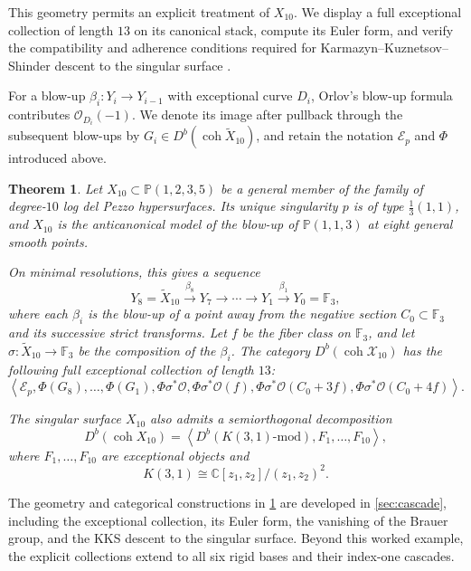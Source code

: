 \documentclass[11pt]{article}
\theoremstyle{plain}
\newtheorem{theorem}{Theorem}[section]
\theoremstyle{definition}
\theoremstyle{remark}
\newcommand{\Pp}{\mathbb P}
\newcommand{\F}{\mathbb F}
\newcommand{\C}{\mathbb C}
\newcommand{\Db}{D^b}
\newcommand{\coh}{\operatorname{coh}}
\newcommand{\OO}{\mathcal O}
\begin{document}
This geometry permits an explicit treatment of \(X_{10}\). We display a full exceptional collection of length \(13\) on its canonical stack, compute its Euler form, and verify the compatibility and adherence conditions required for Karmazyn--Kuznetsov--Shinder descent to the singular surface \cite{KKS2020}.

For a blow-up \(\beta_i:Y_i\to Y_{i-1}\) with exceptional curve \(D_i\), Orlov's blow-up formula contributes \(\OO_{D_i}(-1)\). We denote its image after pullback through the subsequent blow-ups by \(G_i\in\Db(\coh\widetilde X_{10})\), and retain the notation \(\mathcal E_p\) and \(\Phi\) introduced above.

\begin{theorem}\label{thm:X10-main}
Let \(X_{10}\subset \Pp(1,2,3,5)\) be a general member of the family of degree-\(10\) log del Pezzo hypersurfaces. Its unique singularity \(p\) is of type \(\frac13(1,1)\), and \(X_{10}\) is the anticanonical model of the blow-up of \(\Pp(1,1,3)\) at eight general smooth points.

On minimal resolutions, this gives a sequence
\[
Y_8=\widetilde X_{10}
\xrightarrow{\beta_8}
Y_7
\to \cdots \to
Y_1
\xrightarrow{\beta_1}
Y_0=\F_3,
\]
where each \(\beta_i\) is the blow-up of a point away from the negative section \(C_0\subset \F_3\) and its successive strict transforms. Let \(f\) be the fiber class on \(\F_3\), and let \(\sigma:\widetilde X_{10}\to \F_3\) be the composition of the \(\beta_i\). The category \(\Db(\coh\mathcal X_{10})\) has the following full exceptional collection of length \(13\):
\[
\left\langle
\mathcal E_p,
\Phi(G_8),\dots,\Phi(G_1),
\Phi\sigma^*\OO,
\Phi\sigma^*\OO(f),
\Phi\sigma^*\OO(C_0+3f),
\Phi\sigma^*\OO(C_0+4f)
\right\rangle.
\]

The singular surface \(X_{10}\) also admits a semiorthogonal decomposition
\[
\Db(\coh X_{10})
=
\left\langle
\Db(K(3,1)\text{-mod}),F_1,\dots,F_{10}
\right\rangle,
\]
where \(F_1,\dots,F_{10}\) are exceptional objects and
\[
K(3,1)\cong \C[z_1,z_2]/(z_1,z_2)^2.
\]
\end{theorem}

The geometry and categorical constructions in \cref{thm:X10-main} are
developed in \cref{sec:cascade}, including the exceptional collection,
its Euler form, the vanishing of the Brauer group, and the KKS descent
to the singular surface. Beyond this worked example, the explicit
collections extend to all six rigid bases and their index-one cascades.
\end{document}
